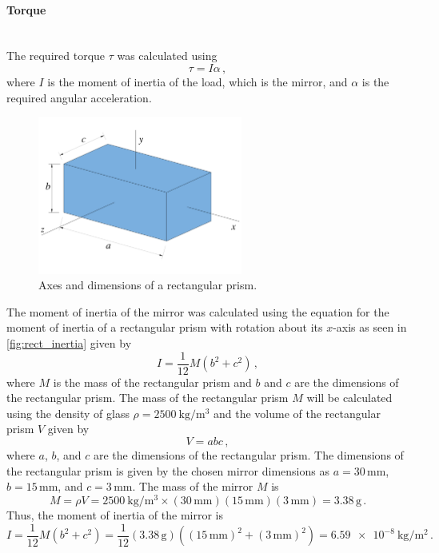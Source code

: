 \paragraph{Torque}\hfill\\
The required torque $\tau$ was calculated using
\begin{equation}
    \tau = I\alpha\,,
    \label{eq:torque}
\end{equation}
where $I$ is the moment of inertia of the load, which is the mirror, and $\alpha$ is the required angular acceleration.

\begin{figure}[h]
    \centering
    \includegraphics[width=0.6\textwidth]{figures/hardware_design/inertia_of_rectangle.pdf}
    \caption{Axes and dimensions of a rectangular prism.}
    \label{fig:rect_inertia}
\end{figure}
The moment of inertia of the mirror was calculated using the equation for the moment of inertia of a rectangular prism with rotation about its $x$-axis as seen in \autoref{fig:rect_inertia} given by
\begin{equation}
    I = \frac{1}{12}M\left(b^2 + c^2\right)\,,
\end{equation}
where $M$ is the mass of the rectangular prism and $b$ and $c$ are the dimensions of the rectangular prism. The mass of the rectangular prism $M$ will be calculated using the density of glass $\rho = \SI{2500}{\kg\per\meter\cubed}$ and the volume of the rectangular prism $V$ given by
\begin{equation}
    V = abc\,,
\end{equation}
where $a$, $b$, and $c$ are the dimensions of the rectangular prism. The dimensions of the rectangular prism is given by the chosen mirror dimensions as $a = 30\,\text{mm}$, $b = 15\,\text{mm}$, and $c = 3\,\text{mm}$. The mass of the mirror $M$ is
\begin{equation}
    M = \rho V = \SI{2500}{\kg\per\meter\cubed} \times (30\,\text{mm})(15\,\text{mm})(3\,\text{mm}) = 3.38\,\text{g}\,.
\end{equation}
Thus, the moment of inertia of the mirror is
\begin{equation}
    I = \frac{1}{12}M\left(b^2 + c^2\right) = \frac{1}{12}(3.38\,\text{g})\left((15\,\text{mm})^2 + (3\,\text{mm})^2\right) = \SI{6.59e-8}{\kg\per\meter\squared}\,.
\end{equation}

